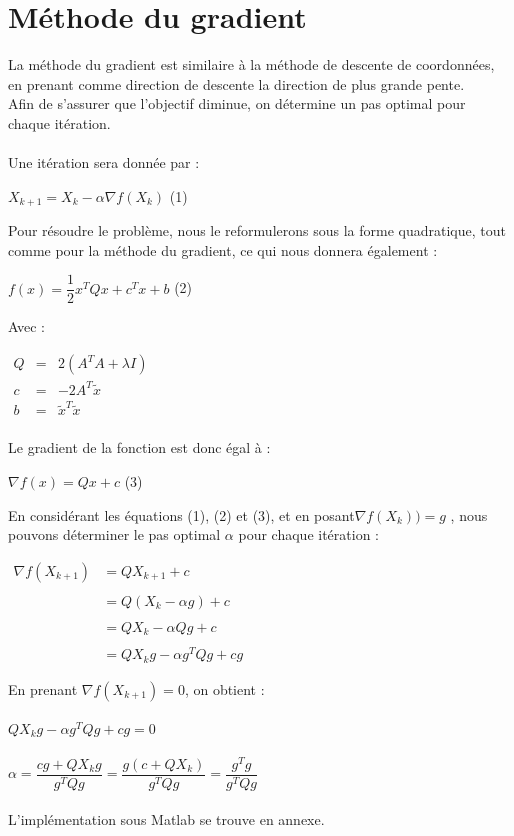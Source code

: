 \documentclass[12pt, a4paper]{report}
\begin{document}
\section{Méthode du gradient}
La méthode du gradient est similaire à la méthode de descente de coordonnées, en prenant comme direction de descente la direction de plus grande pente.\\
Afin de s'assurer que l'objectif diminue, on détermine un pas optimal pour chaque itération.\\
\\Une itération sera donnée par :
\begin{center}
$X_{k+1}=X_k - \alpha \nabla f(X_k)$ (1)
\end{center}
Pour résoudre le problème, nous le reformulerons sous la forme quadratique, tout comme pour la méthode du gradient, ce qui nous donnera également :
\begin{center}
$f(x) = \dfrac{1}{2}x^TQx + c^Tx + b$ (2)
\end{center}
Avec :
\begin{flushleft}
$\begin{array}{rcl}
Q & = & 2(A^TA + \lambda I) \\
c & = & -2A^T\tilde{x} \\
b & = & \tilde{x}^T\tilde{x} \\
\end{array}$
\end{flushleft}
Le gradient de la fonction est donc égal à :\\
\begin{center}
$\nabla f(x) = Qx + c$ (3)
\end{center}
En considérant les équations (1), (2) et (3), et en posant$\nabla f(X_k)) = g$ , nous pouvons déterminer le pas optimal $\alpha$ pour chaque itération :
\begin{flushleft}
$\begin{array}{rl}
\nabla f(X_{k+1}) & = Q X_{k+1} + c\\
\\& = Q (X_k - \alpha g) + c\\
\\& = Q X_k - \alpha Q g + c\\
\\& = Q X_k g - \alpha g^TQ g + c g
\end{array}$
\end{flushleft}
En prenant $\nabla f(X_{k+1}) = 0$, on obtient :\\
\\$Q X_k g - \alpha g^TQ g + c g = 0$\\
\\$\alpha = \dfrac{c g + Q X_k g}{g^TQ g} = \dfrac{g(c + Q X_k)}{g^TQ g} = \dfrac{g^T g}{g^TQ g}$\\
\\L'implémentation sous Matlab se trouve en annexe.
\end{document}
